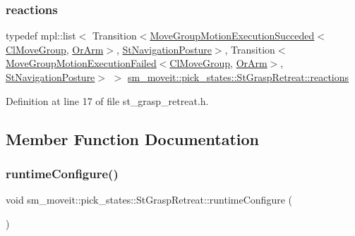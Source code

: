 \subsubsection{\texorpdfstring{reactions}{reactions}}
{\footnotesize\ttfamily typedef mpl\+::list$<$ Transition$<$\hyperlink{structmoveit__z__client_1_1MoveGroupMotionExecutionSucceded}{Move\+Group\+Motion\+Execution\+Succeded}$<$\hyperlink{classmoveit__z__client_1_1ClMoveGroup}{Cl\+Move\+Group}, \hyperlink{classsm__moveit_1_1OrArm}{Or\+Arm}$>$, \hyperlink{structsm__moveit_1_1pick__states_1_1StNavigationPosture}{St\+Navigation\+Posture}$>$, Transition$<$\hyperlink{structmoveit__z__client_1_1MoveGroupMotionExecutionFailed}{Move\+Group\+Motion\+Execution\+Failed}$<$\hyperlink{classmoveit__z__client_1_1ClMoveGroup}{Cl\+Move\+Group}, \hyperlink{classsm__moveit_1_1OrArm}{Or\+Arm}$>$, \hyperlink{structsm__moveit_1_1pick__states_1_1StNavigationPosture}{St\+Navigation\+Posture}$>$ $>$ \hyperlink{structsm__moveit_1_1pick__states_1_1StGraspRetreat_a3427099143b52dbfc165e01dbe2e81ce}{sm\+\_\+moveit\+::pick\+\_\+states\+::\+St\+Grasp\+Retreat\+::reactions}}



Definition at line 17 of file st\+\_\+grasp\+\_\+retreat.\+h.



\subsection{Member Function Documentation}
\mbox{\label{structsm__moveit_1_1pick__states_1_1StGraspRetreat_a1a712867a1888f96a82f19d6ccfb2a76}} 
\subsubsection{\texorpdfstring{runtime\+Configure()}{runtimeConfigure()}}
{\footnotesize\ttfamily void sm\+\_\+moveit\+::pick\+\_\+states\+::\+St\+Grasp\+Retreat\+::runtime\+Configure (\begin{DoxyParamCaption}{ }\end{DoxyParamCaption})\hspace{0.3cm}{\ttfamily [inline]}}



